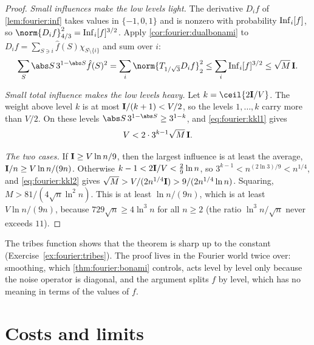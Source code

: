 \begin{refsection}
\begin{proof}
\emph{Small influences make the low levels light.} The derivative $D_if$ of \cref{lem:fourier:inf} takes values in $\{-1,0,1\}$ and is nonzero with probability $\operatorname{Inf}_i[f]$, so $\norm{D_if}_{4/3}^2=\fourierInf_i[f]^{3/2}$. Apply \cref{cor:fourier:dualbonami} to $D_if=\sum_{S\ni i}\hat f(S)\chi_{S\setminus\{i\}}$ and sum over $i$:
\begin{equation}\label{eq:fourier:kkl1}
  \sum_S\abs S\,3^{1-\abs S}\hat f(S)^2=\sum_i\norm{T_{1/\sqrt3}D_if}_2^2\le\sum_i\fourierInf_i[f]^{3/2}\le\sqrt M\,\fourierTI .
\end{equation}

\emph{Small total influence makes the low levels heavy.} Let $k=\ceil{2\fourierTI/V}$. The weight above level $k$ is at most $\mathbf{I}/(k+1)<V/2$, so the levels $1,\dots,k$ carry more than $V/2$. On these levels $\abs S\,3^{1-\abs S}\ge3^{1-k}$, and \eqref{eq:fourier:kkl1} gives
\begin{equation}\label{eq:fourier:kkl2}
  V<2\cdot3^{k-1}\sqrt M\,\mathbf{I} .
\end{equation}

\emph{The two cases.} If $\mathbf{I}\ge V\ln n/9$, then the largest influence is at least the average, $\mathbf{I}/n\ge V\ln n/(9n)$. Otherwise $k-1<2\mathbf{I}/V<\frac29\ln n$, so $3^{k-1}<n^{(2\ln3)/9}<n^{1/4}$, and \eqref{eq:fourier:kkl2} gives $\sqrt M>V/(2n^{1/4}\mathbf{I})>9/(2n^{1/4}\ln n)$. Squaring, $M>81/(4\sqrt n\ln^2n)$. This is at least $\ln n/(9n)$, which is at least $V\ln n/(9n)$, because $729\sqrt n\ge4\ln^3n$ for all $n\ge2$ (the ratio $\ln^3n/\sqrt n$ never exceeds $11$).
\end{proof}

The tribes function shows that the theorem is sharp up to the constant (Exercise~\ref{ex:fourier:tribes}). The proof lives in the Fourier world twice over: smoothing, which \cref{thm:fourier:bonami} controls, acts level by level only because the noise operator is diagonal, and the argument splits $f$ by level, which has no meaning in terms of the values of $f$.

\section{Costs and limits}\label{sec:fourier:costs}


\end{refsection}
